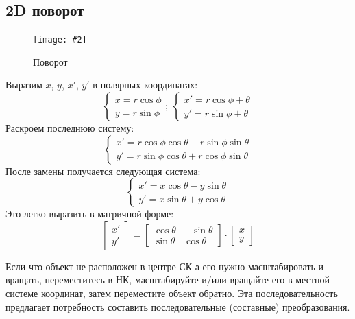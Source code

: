 \documentclass[a4paper, 14pt]{extarticle}
\newcommand{\screenshot}[3]{
	\begin{figure}[h]
		\centering
		\texttt{[image: \#2]}
		\caption{#3}
	\end{figure}
}
\begin{document}
\subsection{2D поворот}
\screenshot{width=6cm}{l3/S008.jpg}{Поворот}
Выразим $x$, $y$, $x'$, $y'$ в полярных координатах:
$$
\begin{cases}
	x = r\cos{\phi}\\
	y = r\sin{\phi}
\end{cases}; \ 
\begin{cases}
	x' = r\cos{\phi + \theta}\\
	y' = r\sin{\phi + \theta}
\end{cases}
$$
Раскроем последнюю систему:
$$
\begin{cases}
	x' = r\cos{\phi}\cos{\theta} - r\sin{\phi}\sin{\theta}\\
	y' = r\sin{\phi}\cos{\theta} + r\cos{\phi}\sin{\theta}
\end{cases}
$$
После замены получается следующая система:
$$
\begin{cases}
	x'=x\cos{\theta} - y\sin{\theta}\\
	y'=x\sin{\theta} + y\cos{\theta}
\end{cases}
$$
Это легко выразить в матричной форме:
$$
\begin{bmatrix} x' \\ y' \end{bmatrix} = \begin{bmatrix}
	\cos{\theta} & -\sin{\theta} \\
	\sin{\theta} & \cos{\theta}
\end{bmatrix} \cdot \begin{bmatrix} x \\ y \end{bmatrix}
$$

Если что объект не расположен в центре СК а его нужно масштабировать и вращать, переместитесь в НК, масштабируйте и/или вращайте его в местной системе координат, затем переместите объект обратно. Эта последовательность предлагает потребность составить последовательные (составные) преобразования.
\end{document}
